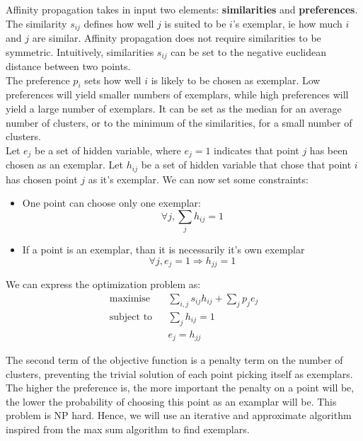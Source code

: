 \documentclass{ipol}
\begin{document}
Affinity propagation takes in input two elements: \textbf{similarities} and
\textbf{preferences}. The similarity $s_{ij}$ defines how well $j$ is suited
to be $i$'s exemplar, ie how much $i$ and $j$ are similar. Affinity
propagation does not require similarities to be symmetric. Intuitively,
similarities $s_{ij}$ can be set to the negative euclidean distance between
two points. \\
The preference $p_i$ sets how well $i$ is likely to be chosen as exemplar.
Low preferences will yield smaller numbers of exemplars, while high
preferences will yield a large number of exemplars. It can be set as the median
for an average number of clusters, or to the minimum of the similarities, for
a small number of clusters. \\
Let $e_j$ be a set of hidden variable, where $e_j = 1$ indicates that point
$j$ has been chosen as an exemplar. Let $h_{ij}$ be a set of hidden variable
that chose that point $i$ has chosen point $j$ as it's exemplar. We can now
set some constraints:
\begin{itemize}
\item One point can choose only one exemplar:
\begin{equation*}
\forall j, \sum_{j} h_{ij} = 1
\end{equation*}
\item If a point is an exemplar, than it is necessarily it's own exemplar
\begin{equation*}
\forall j, e_{j} = 1 \Rightarrow h_{jj} = 1
\end{equation*}
\end{itemize}

We can express the optimization problem as:
\begin{equation*}
\renewcommand{\arraystretch}{2}
\begin{array}{ccl}
\text{maximise} & & \sum_{i, j} s_{ij} h_{ij} + \sum_{j} p_j e_j \\
\text{subject to} &  & \sum_{j} h_{ij} = 1 \\
		  &  & e_{j} = h_{jj}
\end{array}
\end{equation*}


The second term of the objective function is a penalty term on the number of clusters, preventing the
trivial solution of each point picking itself as exemplars. The higher the
preference is, the more important the penalty on a point will be, the lower
the probability of choosing this point as an examplar will be. This problem is
NP hard. Hence, we will use an iterative and approximate algorithm inspired
from the max sum algorithm to find exemplars. \\
\end{document}
